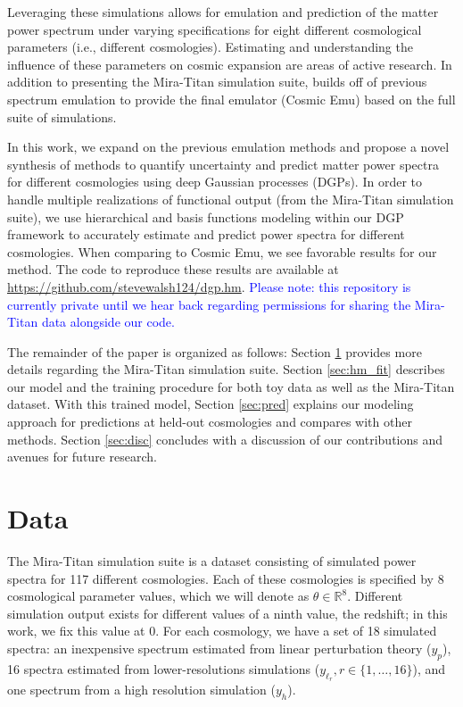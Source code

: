 \documentclass[11pt]{article}
\begin{document}
Leveraging these simulations allows for emulation and prediction of the matter power spectrum under varying specifications for eight different cosmological parameters (i.e., different cosmologies). Estimating and understanding the influence of these parameters on cosmic expansion are areas of active research. In addition to presenting the Mira-Titan simulation suite, \cite{moran2023mira} builds off of previous spectrum emulation \citep{lawrence2017mira} to provide the final emulator (Cosmic Emu) based on the full suite of simulations. 

In this work, we expand on the previous emulation methods and propose a novel synthesis of methods to quantify uncertainty and predict matter power spectra for different cosmologies using deep Gaussian processes (DGPs). In order to handle multiple realizations of functional output (from the Mira-Titan simulation suite), we use hierarchical and basis functions modeling within our DGP framework to accurately estimate and predict power spectra for different cosmologies. When comparing to Cosmic Emu, we see favorable results for our method. The code to reproduce these results are available at \url{https://github.com/stevewalsh124/dgp.hm}. \textcolor{blue}{Please note: this repository is currently private until we hear back regarding permissions for sharing the Mira-Titan data alongside our code.}

The remainder of the paper is organized as follows: Section \ref{sec:data} provides more details regarding the Mira-Titan simulation suite. Section \ref{sec:hm_fit} describes our model and the training procedure for both toy data as well as the Mira-Titan dataset. With this trained model, Section \ref{sec:pred} explains our modeling approach for predictions at held-out cosmologies and compares with other methods. Section \ref{sec:disc} concludes with a discussion of our contributions and avenues for future research.

\section{Data}
\label{sec:data}

The Mira-Titan simulation suite is a dataset consisting of simulated power spectra for 117 different cosmologies. Each of these cosmologies is specified by 8 cosmological parameter values, which we will denote as $\theta \in \mathbb{R}^8$. Different simulation output exists for different values of a ninth value, the redshift; in this work, we fix this value at 0. For each cosmology, we have a set of 18 simulated spectra: an inexpensive spectrum estimated from linear perturbation theory ($y_p$), 16 spectra estimated from lower-resolutions simulations ($y_{\ell_r}, r \in \{1,\dots,16\}$), and one spectrum from a high resolution simulation ($y_h$). 
\end{document}
